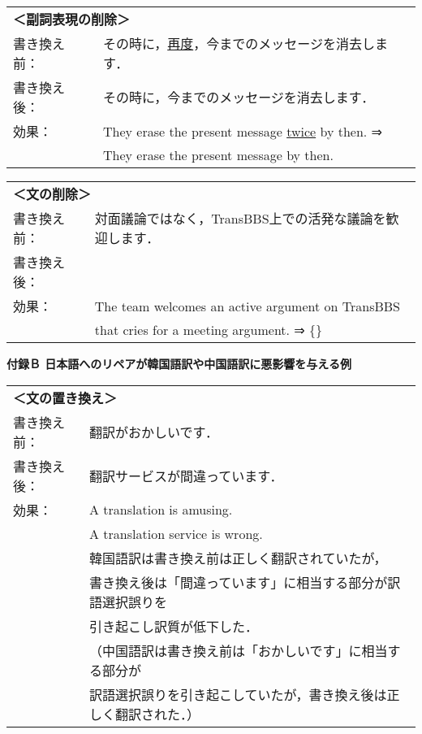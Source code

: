 \begin{tabular}{ll}
\multicolumn{2}{l}{\bf ＜副詞表現の削除＞}   \\
書き換え前： & その時に，\underline{再度}，今までのメッセージを消去します． \\
書き換え後： & その時に，今までのメッセージを消去します．\\
効果： & They erase the present message \underline{twice} by then. ⇒ \\
       & They erase the present message by then. \\
\end{tabular}

\begin{tabular}{ll}
\multicolumn{2}{l}{\bf ＜文の削除＞}   \\
書き換え前： & 対面議論ではなく，TransBBS上での活発な議論を歓迎します． \\
書き換え後： & \\
効果： & The team welcomes an active argument on TransBBS \\ 
       & that cries for a meeting argument. ⇒ \{\} \\
\end{tabular}
\vspace*{3mm}

{\bf 付録Ｂ 日本語へのリペアが韓国語訳や中国語訳に悪影響を与える例}

\vspace*{3mm}
\begin{tabular}{ll}
\multicolumn{2}{l}{\bf ＜文の置き換え＞}   \\
書き換え前： & 翻訳がおかしいです． \\
書き換え後： & 翻訳サービスが間違っています．\\
効果： &  A translation is amusing. \\ 
       &  A translation service is wrong. \\
       & 韓国語訳は書き換え前は正しく翻訳されていたが， \\
       & 書き換え後は「間違っています」に相当する部分が訳語選択誤りを \\
       & 引き起こし訳質が低下した．\\
       & （中国語訳は書き換え前は「おかしいです」に相当する部分が \\
       & 訳語選択誤りを引き起こしていたが，書き換え後は正しく翻訳された．） \\
\end{tabular}

